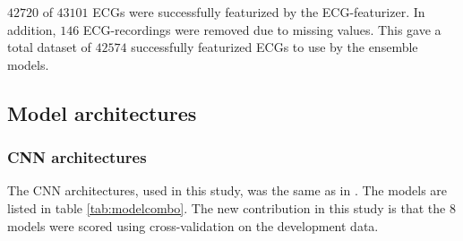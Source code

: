 $42 720$ of $43101$ ECGs were successfully featurized by the ECG-featurizer. In addition, $146$ ECG-recordings were removed due to missing values. This gave a total dataset of $42574$ successfully  featurized ECGs to use by the ensemble models.


\subsection{Model architectures}
\subsubsection{CNN architectures}\hfill \break
The CNN architectures, used in this study, was the same as in \cite{bjorn-jostein_singstad_classifying_2020}. The models are listed in table \ref{tab:modelcombo}. The new contribution in this study is that the $8$ models were scored using cross-validation on the development data. \newline\newline

\vspace{4 mm}
\begin{table}[!htb]
        \centering
        \caption{The eight CNN models developed in \cite{bjorn-jostein_singstad_classifying_2020} and used in this study}
                \label{tab:modelcombo}
\end{table}
\vspace{4 mm}
\newline


